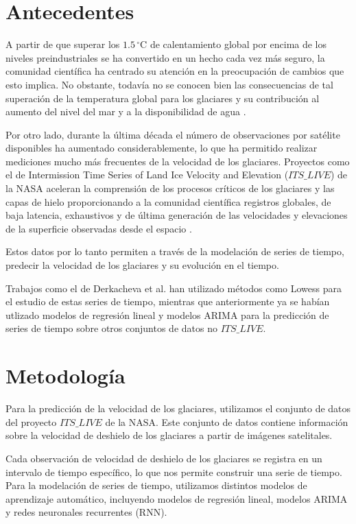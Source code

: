 \documentclass[sigconf,language=spanish]{acmart}
\begin{document}
\section{Antecedentes}

A partir de que superar los $1.5\,^\circ\mathrm{C}$ de calentamiento global por encima de los niveles preindustriales se ha convertido en un hecho cada vez más seguro, 
la comunidad científica ha centrado su atención en la preocupación de cambios que esto implica. 
No obstante, todavía no se conocen bien las consecuencias de tal superación de la temperatura global para los glaciares y su contribución al aumento del nivel del mar y a la disponibilidad de agua \cite{schuster_2025}.


Por otro lado, durante la última década el número de observaciones por satélite disponibles ha aumentado considerablemente, 
lo que ha permitido realizar mediciones mucho más frecuentes de la velocidad de los glaciares.
Proyectos como el de Intermission Time Series of Land Ice Velocity and Elevation ($ITS\_LIVE$) de la NASA 
aceleran la comprensión de los procesos críticos de los glaciares y las capas de hielo proporcionando a la comunidad científica registros globales, 
de baja latencia, exhaustivos y de última generación de las velocidades y elevaciones de la superficie observadas desde el espacio \cite{lei_processing_2021} .

Estos datos por lo tanto permiten a través de la modelación de series de tiempo,
predecir la velocidad de los glaciares y su evolución en el tiempo. 

Trabajos como el de Derkacheva et al. \cite{derkacheva_data_2020} han utilizado métodos como Lowess para el estudio de estas series de tiempo, mientras que anteriormente 
ya se habían utlizado modelos de regresión lineal y modelos ARIMA para la predicción de series de tiempo \cite{noauthor_time_2022} sobre otros conjuntos de datos no  $ITS\_LIVE$.

\section{Metodología}

Para la predicción de la velocidad de los glaciares, utilizamos el conjunto de datos del proyecto  $ITS\_LIVE$ de la NASA.
Este conjunto de datos contiene información sobre la velocidad de deshielo de los glaciares a partir de imágenes satelitales.

Cada observación de velocidad de deshielo de los glaciares se registra en un intervalo de tiempo específico, lo que nos permite construir una serie de tiempo.
Para la modelación de series de tiempo, utilizamos distintos modelos de aprendizaje automático, incluyendo modelos de regresión lineal, modelos ARIMA y redes neuronales recurrentes (RNN).
\end{document}
